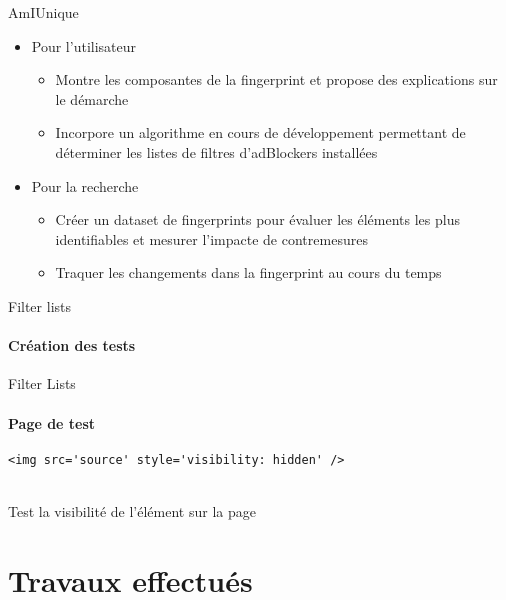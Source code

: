 \documentclass{beamer}
\begin{document}
	\begin{frame}{AmIUnique}
		\begin{itemize}
			\color{gray}
			\item Pour l'utilisateur
			\begin{itemize}
				\color{gray}
				\item Montre les composantes de la fingerprint et propose des explications sur le démarche
				\item Incorpore un algorithme en cours de développement permettant de déterminer  les listes de filtres d'adBlockers installées
			\end{itemize}
			\color{black} \item Pour la recherche
			\begin{itemize}
				\color{gray}
				\item Créer un dataset de fingerprints pour évaluer les éléments les plus identifiables et mesurer l'impacte de contremesures
				\item \color{black} Traquer les changements dans la fingerprint au cours du temps
			\end{itemize}
		\end{itemize}
	\end{frame}

	\begin{frame}{Filter lists}
		\framesubtitle{Création des tests}
		\begin{center}
		\end{center}
	\end{frame}

	\begin{frame}[fragile]{Filter Lists}
		\framesubtitle{Page de test}
		\begin{lstlisting}
<img src='source' style='visibility: hidden' />
		\end{lstlisting}
	
		\begin{center}
			\huge \textdownarrow \\
			\vspace{1em}
			\normalsize Test la visibilité de l'élément sur la page
		\end{center}
	\end{frame}

	\section{Travaux effectués}
\end{document}
